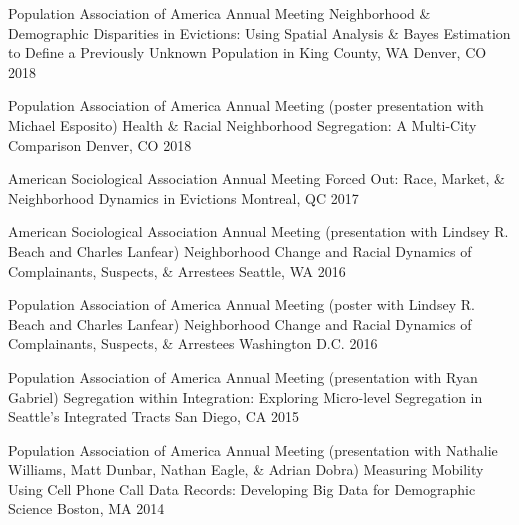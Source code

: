\begin{cventries}
  \cventry
    {Population Association of America Annual Meeting} %
    {Neighborhood \& Demographic Disparities in Evictions: Using Spatial Analysis \& Bayes Estimation to Define a Previously Unknown Population in King County, WA} %
    {Denver, CO} %
    {2018} %
    {}
    
  \cventry
    {Population Association of America Annual Meeting (poster presentation with Michael Esposito)} %
    {Health \& Racial Neighborhood Segregation: A Multi-City Comparison} %
    {Denver, CO} %
    {2018} %
    {}
    
  \cventry
    {American Sociological Association Annual Meeting} %
    {Forced Out: Race, Market, \& Neighborhood Dynamics in Evictions} %
    {Montreal, QC} %
    {2017} %
    {}

  \cventry
    {American Sociological Association Annual Meeting (presentation with Lindsey R. Beach and Charles Lanfear)} %
    {Neighborhood Change and Racial Dynamics of Complainants, Suspects, \& Arrestees} %
    {Seattle, WA} %
    {2016} %
    {}


  \cventry
    {Population Association of America Annual Meeting (poster with Lindsey R. Beach and Charles Lanfear)} %
    {Neighborhood Change and Racial Dynamics of Complainants, Suspects, \& Arrestees} %
    {Washington D.C.} %
    {2016} %
    {}

  \cventry
    {Population Association of America Annual Meeting (presentation with Ryan Gabriel)} %
    {Segregation within Integration: Exploring Micro-level Segregation in Seattle's Integrated Tracts} %
    {San Diego, CA} %
    {2015} %
    {}

  \cventry
    {Population Association of America Annual Meeting (presentation with Nathalie Williams, Matt Dunbar, Nathan Eagle, \& Adrian Dobra)} %
    {Measuring Mobility Using Cell Phone Call Data Records: Developing Big Data for Demographic Science} %
    {Boston, MA} %
    {2014} %
    {}


\end{cventries}
